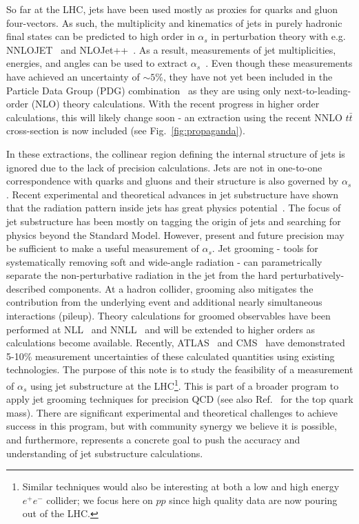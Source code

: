 So far at the LHC, jets have been used mostly as proxies for quarks and gluon four-vectors.  As such, the multiplicity and kinematics of jets in purely hadronic final states can be predicted to high order in $\alpha_s$ in perturbation theory with e.g. NNLOJET~\cite{Currie:2016bfm,Currie:2017ctp} and NLOJet++~\cite{Nagy:2001fj,Nagy:2003tz}.  As a result, measurements of jet multiplicities, energies, and angles can be used to extract $\alpha_s$~\cite{ATLAS:2015yaa,Aaboud:2017fml,Khachatryan:2014waa,CMS:2014mna,Chatrchyan:2013txa}.   Even though these measurements have achieved an uncertainty of $\sim 5\%$, they have not yet been included in the Particle Data Group (PDG) combination~\cite{Olive:2016xmw} as they are using only next-to-leading-order (NLO) theory calculations.  With the recent progress in higher order calculations, this will likely change soon - an extraction using the recent NNLO $t\bar{t}$ cross-section is now included (see Fig.~\ref{fig:propaganda}).

In these extractions, the collinear region defining the internal structure of jets is ignored due to the lack of precision calculations.  Jets are not in one-to-one correspondence with quarks and gluons and their structure is also governed by $\alpha_s$.  Recent experimental and theoretical advances in jet substructure have shown that the radiation pattern inside jets has great physics potential~\cite{Abdesselam:2010pt,Altheimer:2012mn,Altheimer:2013yza,Adams:2015hiv,Larkoski:2017jix}.  The focus of jet substructure has been mostly on tagging the origin of jets and searching for physics beyond the Standard Model.  However, present and future precision may be sufficient to make a useful measurement of $\alpha_s$.  Jet grooming - tools for systematically removing soft and wide-angle radiation - can parametrically separate the non-perturbative radiation in the jet from the hard perturbatively-described components.  At a hadron collider, grooming also mitigates the contribution from the underlying event and additional nearly simultaneous interactions (pileup).  Theory calculations for groomed observables have been performed at NLL~\cite{Marzani:2017kqd,Marzani:2017mva} and NNLL~\cite{Frye:2016aiz,Frye:2016okc} and will be extended to higher orders as calculations become available.  Recently, ATLAS~\cite{Aaboud:2017qwh} and CMS~\cite{CMS-PAS-SMP-16-010} have demonstrated 5-10\% measurement uncertainties of these calculated quantities using existing technologies.   The purpose of this note is to study the feasibility of a measurement of $\alpha_s$ using jet substructure at the LHC\footnote{Similar techniques would also be interesting at both a low and high energy $e^+e^-$ collider; we focus here on $pp$ since high quality data are now pouring out of the LHC.}.  This is part of a broader program to apply jet grooming techniques for precision QCD (see also Ref.~\cite{Hoang:2017kmk} for the top quark mass).  There are significant experimental and theoretical challenges to achieve success in this program, but with community synergy we believe it is possible, and furthermore, represents a concrete goal to push the accuracy and understanding of jet substructure calculations.



